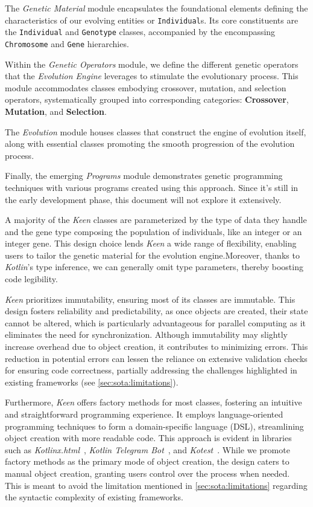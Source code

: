     The \emph{Genetic Material} module encapsulates the foundational elements defining the 
    characteristics of our evolving entities or \texttt{Individual}s. Its core constituents are the 
    \texttt{Individual} and \texttt{Genotype} classes, accompanied by the encompassing 
    \texttt{Chromosome} and \texttt{Gene} hierarchies.

    Within the \emph{Genetic Operators} module, we define the different genetic operators that the \textit{Evolution Engine} leverages to stimulate the evolutionary process. This module accommodates classes embodying crossover, mutation, and selection operators, systematically grouped into corresponding categories: \textbf{Crossover}, \textbf{Mutation}, and \textbf{Selection}.

    The \emph{Evolution} module houses classes that construct the engine of evolution itself, along with essential classes promoting the smooth progression of the evolution process.

    Finally, the emerging \emph{Programs} module demonstrates genetic programming techniques with various programs created using this approach. Since it's still in the early development phase, this document will not explore it extensively.

    A majority of the \textit{Keen} classes are parameterized by the type of data they handle and the gene type composing the population of individuals, like an integer or an integer gene. This design choice lends \textit{Keen} a wide range of flexibility, enabling users to tailor the genetic material for the evolution engine.Moreover, thanks to \textit{Kotlin}'s type inference, we can generally omit type parameters, thereby boosting code legibility.

    \textit{Keen} prioritizes immutability, ensuring most of its classes are immutable.
    This design fosters reliability and predictability, as once objects are created, their state cannot be altered, which is particularly advantageous for parallel computing as it eliminates the need for synchronization.
    Although immutability may slightly increase overhead due to object creation, it contributes to minimizing errors.
    This reduction in potential errors can lessen the reliance on extensive validation checks for ensuring code correctness, partially addressing the challenges highlighted in existing frameworks (see \vref{sec:sota:limitations}).

    Furthermore, \textit{Keen} offers factory methods for most classes, fostering an intuitive and straightforward programming experience. It employs language-oriented programming techniques to form a domain-specific language (DSL), streamlining object creation with more readable code. This approach is evident in libraries such as 
    \textit{Kotlinx.html}~\autocite{KotlinxHtml2023}, \textit{Kotlin Telegram Bot}~\autocite{KotlinTelegramBot2023}, and \textit{Kotest}~\autocite{KotestKotesta}. While we promote factory methods as the primary mode of object creation, the design caters to manual object creation, granting users control over the process when needed.
    This is meant to avoid the limitation mentioned in \vref{sec:sota:limitations} regarding the syntactic complexity of existing frameworks.


